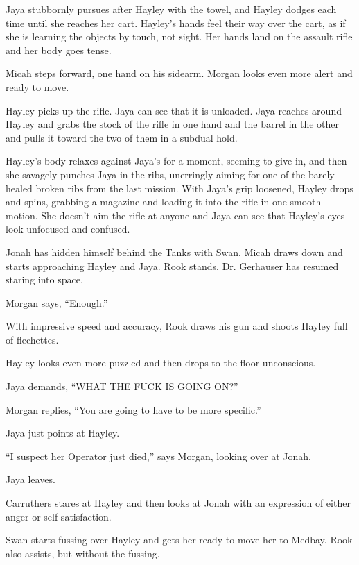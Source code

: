 Jaya stubbornly pursues after Hayley with the towel, and Hayley dodges each time until she reaches her cart.  Hayley's hands feel their way over the cart, as if she is learning the objects by touch, not sight.  Her hands land on the assault rifle and her body goes tense.



Micah steps forward, one hand on his sidearm.  Morgan looks even more alert and ready to move.



Hayley picks up the rifle.  Jaya can see that it is unloaded.  Jaya reaches around Hayley and grabs the stock of the rifle in one hand and the barrel in the other and pulls it toward the two of them in a subdual hold.



Hayley's body relaxes against Jaya's for a moment, seeming to give in, and then she savagely punches Jaya in the ribs, unerringly aiming for one of the barely healed broken ribs from the last mission.  With Jaya's grip loosened, Hayley drops and spins, grabbing a magazine and loading it into the rifle in one smooth motion.  She doesn't aim the rifle at anyone and Jaya can see that Hayley's eyes look unfocused and confused.



Jonah has hidden himself behind the Tanks with Swan.  Micah draws down and starts approaching Hayley and Jaya.  Rook stands.  Dr. Gerhauser has resumed staring into space.



Morgan says, ``Enough.''

With impressive speed and accuracy, Rook draws his gun and shoots Hayley full of flechettes.

Hayley looks even more puzzled and then drops to the floor unconscious.



Jaya demands, ``WHAT THE FUCK IS GOING ON?''

Morgan replies, ``You are going to have to be more specific.''

Jaya just points at Hayley.

``I suspect her Operator just died,'' says Morgan, looking over at Jonah.

Jaya leaves.

Carruthers stares at Hayley and then looks at Jonah with an expression of either anger or self-satisfaction.

Swan starts fussing over Hayley and gets her ready to move her to Medbay.  Rook also assists, but without the fussing.




